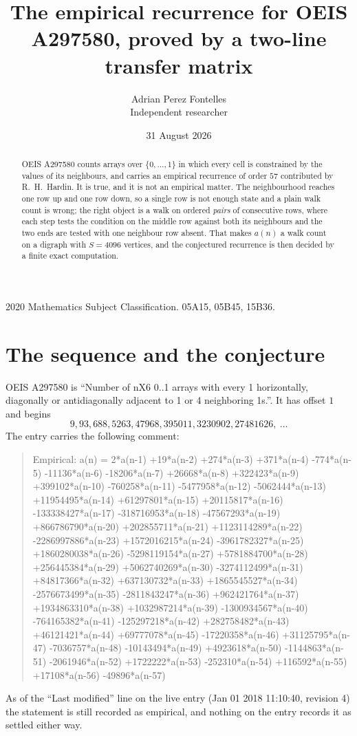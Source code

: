 \documentclass[11pt,a4paper]{article}
\title{The empirical recurrence for OEIS A297580, proved by a two-line transfer matrix}
\author{Adrian Perez Fontelles\\ \small Independent researcher}
\date{31 August 2026}
\theoremstyle{plain}
\theoremstyle{definition}
\begin{document}
\maketitle

\begin{abstract}
OEIS A297580 counts arrays over $\{0,\dots,1\}$ in which every cell is constrained by the
values of its neighbours, and carries an empirical recurrence of order $57$ contributed
by R.~H.~Hardin. It is true, and it is not an empirical matter. The neighbourhood reaches one
row up and one row down, so a single row is not enough state and a plain walk count
is wrong; the right object is a walk on ordered \emph{pairs} of consecutive rows, where
each step tests the condition on the middle row against both its neighbours and the two
ends are tested with one neighbour row absent. That makes $a(n)$ a walk count on a digraph
with $S=4096$ vertices, and the conjectured recurrence is then decided by a finite exact
computation.
\end{abstract}

\noindent\small 2020 Mathematics Subject Classification. 05A15, 05B45, 15B36.\normalsize

\section{The sequence and the conjecture}

OEIS A297580 is ``Number of nX6 0..1 arrays with every 1 horizontally, diagonally or antidiagonally adjacent to 1 or 4 neighboring 1s.''. It has offset $1$ and begins
\[
9, 93, 688, 5263, 47968, 395011, 3230902, 27481626,\ \dots
\]
The entry carries the following comment:
\begin{quote}\small
Empirical: a(n) = 2*a(n-1) +19*a(n-2) +274*a(n-3) +371*a(n-4) -774*a(n-5) -11136*a(n-6) -18206*a(n-7) +26668*a(n-8) +322423*a(n-9) +399102*a(n-10) -760258*a(n-11) -5477958*a(n-12) -5062444*a(n-13) +11954495*a(n-14) +61297801*a(n-15) +20115817*a(n-16) -133338427*a(n-17) -318716953*a(n-18) -47567293*a(n-19) +866786790*a(n-20) +202855711*a(n-21) +1123114289*a(n-22) -2286997886*a(n-23) +1572016215*a(n-24) -3961782327*a(n-25) +1860280038*a(n-26) -5298119154*a(n-27) +5781884700*a(n-28) +256445384*a(n-29) +5062740269*a(n-30) -3274112499*a(n-31) +84817366*a(n-32) +637130732*a(n-33) +1865545527*a(n-34) -2576673499*a(n-35) -2811843247*a(n-36) +962421764*a(n-37) +1934863310*a(n-38) +1032987214*a(n-39) -1300934567*a(n-40) -764165382*a(n-41) -125297218*a(n-42) +282758482*a(n-43) +46121421*a(n-44) +69777078*a(n-45) -17220358*a(n-46) +31125795*a(n-47) -7036757*a(n-48) -10143494*a(n-49) +4923618*a(n-50) -1144863*a(n-51) -2061946*a(n-52) +1722222*a(n-53) -252310*a(n-54) +116592*a(n-55) +17108*a(n-56) -49896*a(n-57)
\end{quote}
As of the ``Last modified'' line on the live entry (Jan 01 2018 11:10:40, revision 4) the statement is
still recorded as empirical, and nothing on the entry records it as settled either way.
\end{document}
